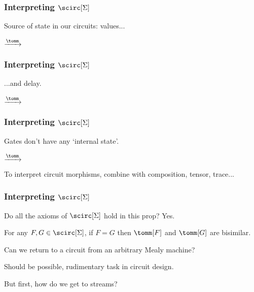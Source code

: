 \begin{frame}
    \frametitle{Interpreting $\scirc[\Sigma]$}    

    Source of \alert{state} in our circuits: \alert{values}...

    \pause

    \begin{center}
        \qquad
        \pause
        $\xrightarrow{\tomm}$
        \qquad
        \raisebox{-1.25em}{}
    \end{center}
\end{frame}

\begin{frame}
    \frametitle{Interpreting $\scirc[\Sigma]$}    
    ...and \alert{delay}.

    \pause
    \begin{center}
        \qquad
        \pause
        $\xrightarrow{\tomm}$
        \qquad
        \raisebox{-8em}{}
    \end{center}
\end{frame}


\begin{frame}
    \frametitle{Interpreting $\scirc[\Sigma]$}

    Gates don't have any `internal state'.

    \pause

    \begin{center}
        \qquad
        \pause
        $\xrightarrow{\tomm}$
        \qquad
        \raisebox{-1em}{}
    \end{center}

    \pause

    To interpret circuit morphisms, combine with composition, tensor, trace...

\end{frame}


\begin{frame}
    \frametitle{Interpreting $\scirc[\Sigma]$}

    Do all the axioms of $\scirc[\Sigma]$ hold in this prop? \pause \alert{Yes.}

    \pause

    \begin{theorem}
        For any $F,G \in \scirc[\Sigma]$, if $F = G$ then $\tomm[F]$ and $\tomm[G]$ are bisimilar.
    \end{theorem}

    \pause

    Can we return to a circuit from an arbitrary Mealy machine? 

    \pause

    Should be possible, rudimentary task in circuit design.
 
    \pause

    But first, how do we get to \alert{streams}?

\end{frame}